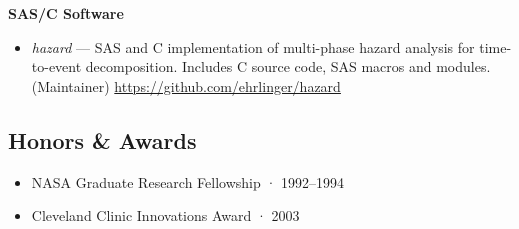 \documentclass[letterpaper,
            11pt]
            {moderncv}
\providecommand{\tightlist}{\setlength{\itemsep}{0pt}\setlength{\parskip}{0pt}}
\begin{document}
\textbf{SAS/C Software}

\begin{itemize}
\tightlist
\item
  \emph{hazard} --- SAS and C implementation of multi-phase hazard
  analysis for time-to-event decomposition. Includes C source code, SAS
  macros and modules. (Maintainer)
  \url{https://github.com/ehrlinger/hazard}
\end{itemize}

\subsection{Honors \& Awards}\label{honors-awards}

\begin{itemize}
\tightlist
\item
  NASA Graduate Research Fellowship · 1992--1994
\item
  Cleveland Clinic Innovations Award · 2003
\end{itemize}

\nocite{*}
\printbibliography[keyword={primary}, title={Publications}, heading=subbibliography]
\printbibliography[keyword={secondary}, title={In Revision /
Submitted}, heading=subbibliography]
\printbibliography[keyword={inprep}, title={In
Preparation}, heading=subbibliography]
\printbibliography[keyword={technote}, title={Technical
Reports}, heading=subbibliography]
\printbibliography[keyword={presentation}, title={Conference
Presentations}, heading=subbibliography]
\end{document}
